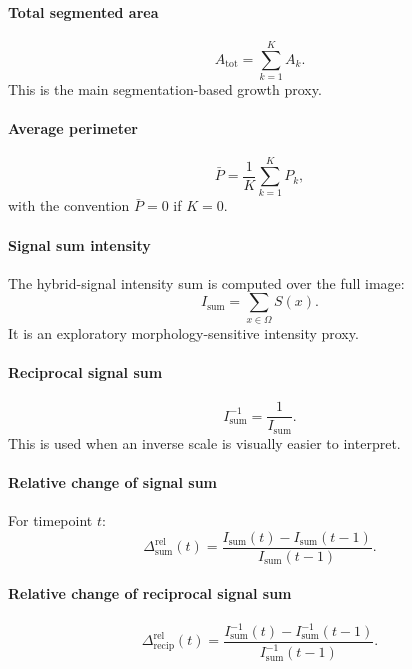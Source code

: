 \documentclass[11pt]{article}
\newcommand{\1}{\mathbf{1}}
\newcommand{\signal}{S}
\begin{document}
\paragraph{Total segmented area}
\begin{equation}
A_{\mathrm{tot}} = \sum_{k=1}^{K} A_k.
\end{equation}
This is the main segmentation-based growth proxy.

\paragraph{Average perimeter}
\begin{equation}
\bar{P} = \frac{1}{K}\sum_{k=1}^{K} P_k,
\end{equation}
with the convention $\bar{P}=0$ if $K=0$.

\paragraph{Signal sum intensity}
The hybrid-signal intensity sum is computed over the full image:
\begin{equation}
I_{\mathrm{sum}} = \sum_{x\in\Omega} \signal(x).
\end{equation}
It is an exploratory morphology-sensitive intensity proxy.

\paragraph{Reciprocal signal sum}
\begin{equation}
I_{\mathrm{sum}}^{-1} = \frac{1}{I_{\mathrm{sum}}}.
\end{equation}
This is used when an inverse scale is visually easier to interpret.

\paragraph{Relative change of signal sum}
For timepoint $t$:
\begin{equation}
\Delta_{\mathrm{sum}}^{\mathrm{rel}}(t) = \frac{I_{\mathrm{sum}}(t)-I_{\mathrm{sum}}(t-1)}{I_{\mathrm{sum}}(t-1)}.
\end{equation}

\paragraph{Relative change of reciprocal signal sum}
\begin{equation}
\Delta_{\mathrm{recip}}^{\mathrm{rel}}(t) = \frac{I_{\mathrm{sum}}^{-1}(t)-I_{\mathrm{sum}}^{-1}(t-1)}{I_{\mathrm{sum}}^{-1}(t-1)}.
\end{equation}
\end{document}
